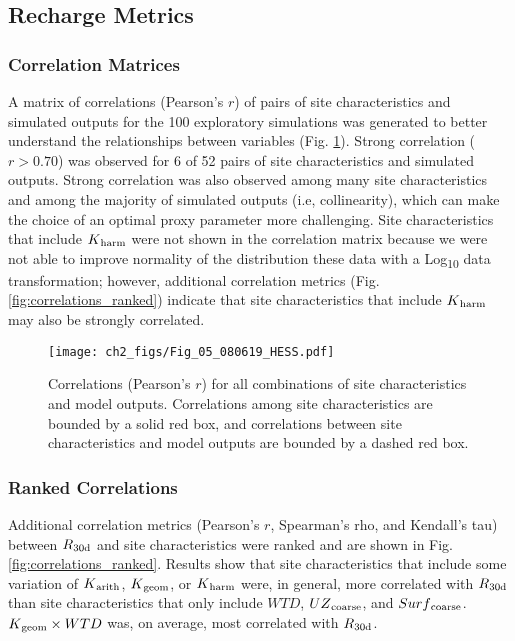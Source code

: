 \subsection{Recharge Metrics} \label{ssec:R_rech_metrics}
\subsubsection{Correlation Matrices} \label{sssec:R_correlation_matrix}
 A matrix of correlations (Pearson's $r$) of pairs of site characteristics and simulated outputs for the 100 exploratory simulations was generated to better understand the relationships between variables (Fig. \ref{fig:correlations}). Strong correlation ($r > 0.70$)  was observed for 6 of 52 pairs of site characteristics and simulated outputs. Strong correlation was also observed among many site characteristics and among the majority of simulated outputs (i.e, collinearity), which can make the choice of an optimal proxy parameter more challenging. Site characteristics that include $K\textsubscript{harm}$ were not shown in the correlation matrix because we were not able to improve normality of the distribution these data with a Log\textsubscript{10} data transformation; however, additional correlation metrics (Fig. \ref{fig:correlations_ranked}) indicate that site characteristics that include $K\textsubscript{harm}$ may also be strongly correlated.
 
\begin{figure}[t]
\centering
\texttt{[image: ch2\_figs/Fig\_05\_080619\_HESS.pdf]}
\caption{Correlations (Pearson's $r$) for all combinations of site characteristics and model outputs. Correlations among site characteristics are bounded by a solid red box, and correlations between site characteristics and model outputs are bounded by a dashed red box.}
\label{fig:correlations}
\end{figure}
\subsubsection{Ranked Correlations} \label{sssec:R_ranked_correlations}
 Additional correlation metrics (Pearson's $r$, Spearman's rho, and Kendall's tau) between $R\textsubscript{30d}$ and site characteristics were ranked and are shown in Fig. \ref{fig:correlations_ranked}. Results show that site characteristics that include some variation of $K\textsubscript{arith}$, $K\textsubscript{geom}$, or $K\textsubscript{harm}$ were, in general, more correlated with $R\textsubscript{30d}$ than site characteristics that only include $WTD$, $UZ\textsubscript{coarse}$, and $Surf\textsubscript{coarse}$. $K\textsubscript{geom} \times WTD$ was, on average, most correlated with $R\textsubscript{30d}$.
 
